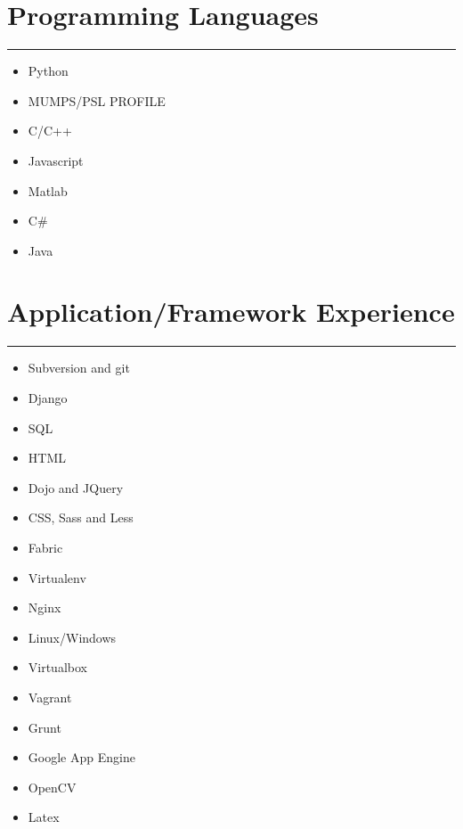 \documentclass[a4paper,english]{article}
\newcommand{\topic}[1]{
\section*{#1} \vspace{-6mm}
\rule{\columnwidth}{.25mm}
}
\begin{document}
\topic{Programming Languages}

\noindent
\begin{minipage}[t]{0.5\linewidth}
    \begin{itemize}
    \setlength{\itemsep}{-1mm}
    \item Python
    \item MUMPS/PSL PROFILE
    \item C/C++
    \item Javascript
    \end{itemize}
\end{minipage}
\begin{minipage}[t]{0.5\linewidth}
    \begin{itemize}
    \setlength{\itemsep}{-1mm}
    \item Matlab
    \item C\#
    \item Java
    \end{itemize}
\end{minipage}

\newpage
\topic{Application/Framework Experience}

\noindent
\begin{minipage}[t]{0.5\linewidth}
    \begin{itemize}
    \setlength{\itemsep}{-1mm}
    \item Subversion and git
    \item Django
    \item SQL
    \item HTML
    \item Dojo and JQuery
    \item CSS, Sass and Less
    \item Fabric
    \item Virtualenv
    \end{itemize}
\end{minipage}
\begin{minipage}[t]{0.5\linewidth}
    \begin{itemize}
    \setlength{\itemsep}{-1mm}
    \item Nginx
    \item Linux/Windows
    \item Virtualbox
    \item Vagrant
    \item Grunt
    \item Google App Engine
    \item OpenCV
    \item Latex
    \end{itemize}
\end{minipage}
\end{document}
